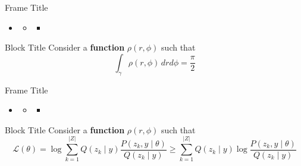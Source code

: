 \documentclass[10pt, aspectratio=169]{beamer}
\newcommand{\colorbf}[1]{{\color{umGreen}\textbf{#1}}}
\begin{document}
\begin{frame}{Frame Title}
    \begin{itemize}
    \item \lipsum[2][2]
        \begin{itemize}
        \item \lipsum[3][2]
            \begin{itemize}
            \item \lipsum[4][2]
            \end{itemize}
        \end{itemize}
    \end{itemize}

    \begin{block}{Block Title}
        Consider a \colorbf{function} $\rho(r,\phi)$ such that
        \begin{equation}
            \label{eq:1}
            \int_{\gamma} \rho(r,\phi)\, drd\phi=\frac{\pi}{2}
        \end{equation}
    \end{block}
\end{frame}


\begin{frame}{Frame Title}
    \begin{itemize}
    \item \lipsum[2][2]
        \begin{itemize}
        \item \lipsum[3][2]
            \begin{itemize}
            \item \lipsum[4][2]
            \end{itemize}
        \end{itemize}
    \end{itemize}

    \begin{block}{Block Title}
        Consider a \colorbf{function} $\rho(r,\phi)$ such that
        \begin{equation*}
            \mathcal{L} (\theta) = \log \sum_{k=1}^{\lvert Z \rvert} Q(z_k \mid y) \frac{P( z_k,  y \mid \theta)}{Q(z_k \mid y)} \geq \sum_{k=1}^{\lvert Z \rvert} Q(z_k \mid y) \log \frac{P( z_k,  y \mid \theta)}{Q(z_k \mid y)}
        \end{equation*}
    \end{block}
\end{frame}
\end{document}
